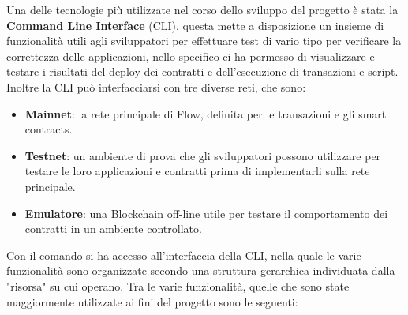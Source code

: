Una delle tecnologie più utilizzate nel corso dello sviluppo del progetto è stata la \textbf{Command Line Interface} (CLI), questa mette a disposizione un insieme di funzionalità utili agli sviluppatori per effettuare test di vario tipo per verificare la correttezza delle applicazioni, nello specifico ci ha permesso di visualizzare e testare i risultati del deploy dei contratti e dell'esecuzione di transazioni e script. Inoltre la CLI può interfacciarsi con tre diverse reti, che sono:
\begin{itemize}
	\item \textbf{Mainnet}: la rete principale di Flow, definita per le transazioni e gli smart contracts.
	\item \textbf{Testnet}: un ambiente di prova che gli sviluppatori possono utilizzare per testare le loro applicazioni e contratti prima di implementarli sulla rete principale.
	\item \textbf{Emulatore}: una Blockchain off-line utile per testare il comportamento dei contratti in un ambiente controllato.
\end{itemize}
Con il comando  si ha accesso all'interfaccia della CLI, nella quale le varie funzionalità sono organizzate secondo una struttura gerarchica individuata dalla "risorsa" su cui operano. Tra le varie funzionalità, quelle che sono state maggiormente utilizzate ai fini del progetto sono le seguenti:
